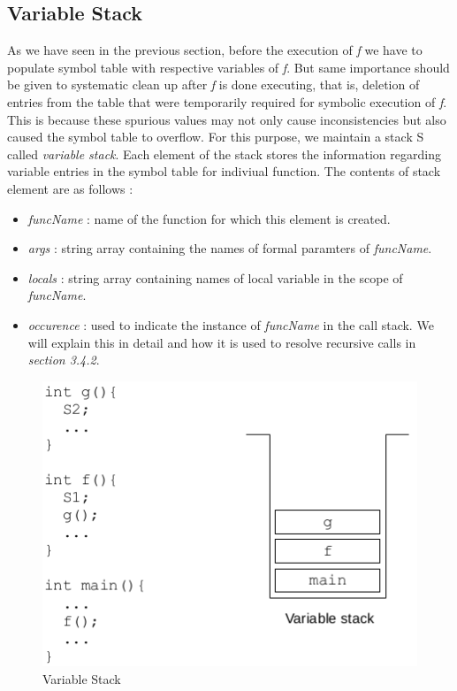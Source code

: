 \documentclass[12pt,oneside]{book}
\begin{document}
\subsection{Variable Stack}
As we have seen in the previous section, before the execution of \textit{f} we have to populate symbol table with respective variables of \textit{f}. But same importance should be given to systematic clean up after \textit{f} is done executing, that is, deletion of entries from the table that were temporarily required for symbolic execution of \textit{f}. This is because these spurious values may not only cause inconsistencies but also caused the symbol table to overflow. 
For this purpose, we maintain a stack S called \textit{variable stack}. Each element of the stack stores the information regarding variable entries in the symbol table for indiviual function. The contents of stack element are as follows : 
\begin{itemize}
 \item \textit{funcName} : name of the function for which this element is created.
 \item \textit{args} : string array containing the names of formal paramters of \textit{funcName}.
  \item \textit{locals} : string array containing names of local variable in the scope of \textit{funcName}.
  \item \textit{occurence} : used to indicate the instance of \textit{funcName} in the call stack. We will explain this in detail and how it is used to resolve recursive calls in \textit{section 3.4.2}. 
\end{itemize}

\vspace{0.3cm}
\begin{figure}[htbp]
\centering
\includegraphics[scale=0.60]{stack.png}
\caption{Variable Stack}
\end{figure}
\end{document}
